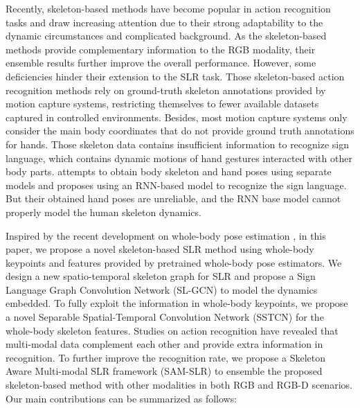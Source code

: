 \documentclass[final]{cvpr}
\begin{document}
Recently, skeleton-based methods have become popular in action recognition tasks \cite{yan2018spatial,skeleton_tsrnn,shi2020skeleton,chengdecoupling,song2020stronger} and draw increasing attention due to their strong adaptability to the dynamic circumstances and complicated background. As the skeleton-based methods provide complementary information to the RGB modality, their ensemble results further improve the overall performance. 
However, some deficiencies hinder their extension to the SLR task. Those skeleton-based action recognition methods rely on ground-truth skeleton annotations provided by motion capture systems, restricting themselves to fewer available datasets captured in controlled environments. Besides, most motion capture systems only consider the main body coordinates that do not provide ground truth annotations for hands. Those skeleton data contains insufficient information to recognize sign language, which contains dynamic motions of hand gestures interacted with other body parts. \cite{xiao2020skeleton} attempts to obtain body skeleton and hand poses using separate models and proposes using an RNN-based model to recognize the sign language. But their obtained hand poses are unreliable, and the RNN base model cannot properly model the human skeleton dynamics. 


Inspired by the recent development on whole-body pose estimation \cite{jin2020whole}, in this paper, we propose a novel skeleton-based SLR method using whole-body keypoints and features provided by pretrained whole-body pose estimators. We design a new spatio-temporal skeleton graph for SLR and propose a Sign Language Graph Convolution Network (SL-GCN) to model the dynamics embedded. To fully exploit the information in whole-body keypoints, we propose a novel Separable Spatial-Temporal Convolution Network (SSTCN) for the whole-body skeleton features. Studies on action recognition have revealed that multi-modal data complement each other and provide extra information in recognition. 
To further improve the recognition rate, we propose a Skeleton Aware Multi-modal SLR framework (SAM-SLR) to ensemble the proposed skeleton-based method with other modalities in both RGB and RGB-D scenarios. Our main contributions can be summarized as follows:
\end{document}
